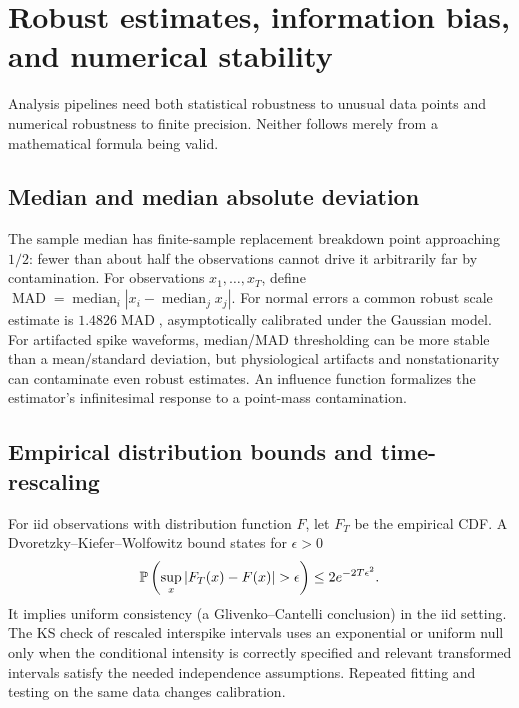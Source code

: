 \chapter[Robust and numerical inference]{Robust estimates, information bias, and numerical stability}
\label{ch:robust-numerical}
Analysis pipelines need both statistical robustness to unusual
data points and numerical robustness to finite precision.
Neither follows merely from a mathematical formula being valid.

\section{Median and median absolute deviation}
The sample median has finite-sample replacement breakdown
point approaching $1/2$: fewer than about half the observations
cannot drive it arbitrarily far by contamination.
For observations $x_1,\ldots,x_T$, define
$\operatorname{MAD}=\operatorname{median}_i|x_i-
\operatorname{median}_j x_j|$.
For normal errors a common robust scale estimate is
$1.4826\operatorname{MAD}$, asymptotically calibrated
under the Gaussian model. For artifacted spike waveforms,
median/MAD thresholding can be more stable than a mean/standard
deviation, but physiological artifacts and nonstationarity
can contaminate even robust estimates. An influence function
formalizes the estimator's infinitesimal response to a
point-mass contamination.

\section{Empirical distribution bounds and time-rescaling}
For iid observations with distribution function $F$, let $F_T$
be the empirical CDF. A Dvoretzky--Kiefer--Wolfowitz bound
states for $\epsilon>0$
\[
\Prob\left(\sup_x|F_T(x)-F(x)|>\epsilon\right)
\le2e^{-2T\epsilon^2}.
\]
It implies uniform consistency (a Glivenko--Cantelli conclusion)
in the iid setting. The KS check of rescaled interspike intervals
uses an exponential or uniform null only when the conditional
intensity is correctly specified and relevant transformed
intervals satisfy the needed independence assumptions.
Repeated fitting and testing on the same data changes calibration.

